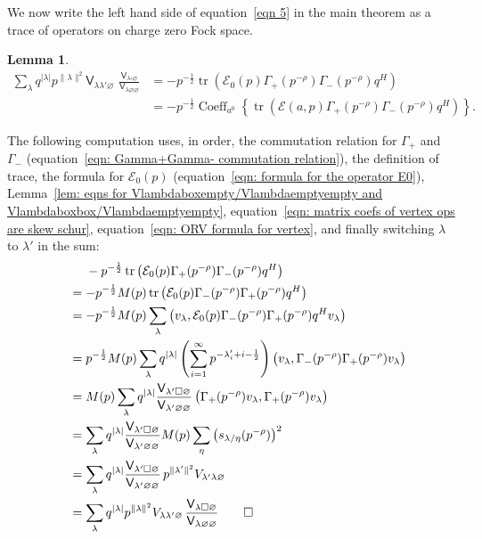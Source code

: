 \documentclass[12pt]{amsart}
\newcommand{\Vsf}{\mathsf{V}}
\newcommand{\bx}{\square}
\renewcommand{\emptyset}{\varnothing}
\newcommand{\half}{\frac{1}{2}}
\newtheorem{lemma}[theorem]{Lemma}
\theoremstyle{definition}
\newcommand{\tr}{\operatorname{tr}}
\newcommand{\E}{\mathcal{E}}
\newcommand{\ptotheminusrho}{p^{-\rho}}
\begin{document}
We now write the left hand side of equation~\eqref{eqn 5} in the main
theorem as a trace of operators on charge zero Fock space.
\begin{lemma}\label{lem: eqn 5 written as a trace}
\begin{align*}
\sum_{\lambda} q^{|\lambda |} p^{\| \lambda \| ^{2}} \Vsf_{\lambda
\lambda' \emptyset}\,\, \frac{\Vsf_{\lambda \bx
\emptyset}}{\Vsf_{\lambda \emptyset \emptyset}}& = -p^{-\half} \tr
\left(\E
_0(p)\Gamma_{+}(\ptotheminusrho )\Gamma_{-}(\ptotheminusrho )q^{H} \right)\\
& =- p^{-\half} \operatorname{Coeff}_{a^{0}}\left\{\tr
\left(\E(a,p)\Gamma_{+}(\ptotheminusrho )\Gamma_{-}(\ptotheminusrho
)q^{H} \right) \right\}.
\end{align*}
\end{lemma}
\proof The following computation uses, in order, the commutation
relation for $\Gamma_{+}$ and $\Gamma_{-}$ (equation~\eqref{eqn:
Gamma+Gamma- commutation relation}), the definition of trace, the
formula for $\E_{0} (p)$ (equation~\eqref{eqn: formula for the
operator E0}), Lemma~\ref{lem: eqns for
Vlambdaboxempty/Vlambdaemptyempty and
Vlambdaboxbox/Vlambdaemptyempty}, equation~\eqref{eqn: matrix coefs of
vertex ops are skew schur}, equation~\eqref{eqn: ORV formula for
vertex}, and finally switching $\lambda$ to $\lambda '$ in the sum:
\begin{align*}
\quad &\,\, \quad - p^{-\half} \tr \left(\E_{0}(p)\Gamma_{+}(\ptotheminusrho )\Gamma_{-}(\ptotheminusrho )q^{H} \right)\\
& =- p^{-\half} M(p) \tr \left(\E_{0}(p)\Gamma_{-}(\ptotheminusrho )\Gamma_{+}(\ptotheminusrho )q^{H} \right)\\
&=-p^{-\half}M(p)\sum_{\lambda} \left(v_{\lambda}, \E_{0}(p)\Gamma_{-}(\ptotheminusrho )\Gamma_{+}(\ptotheminusrho )q^{H} v_{\lambda}\right)\\
&=p^{-\half }M(p) \sum_{\lambda} q^{|\lambda |}
\left(\sum_{i=1}^{\infty}
p^{-\lambda'_{i}+i-\half} \right) \left(v_{\lambda}, \Gamma_{-}(\ptotheminusrho )\Gamma_{+}(\ptotheminusrho )v_{\lambda} \right)\\
&=M(p)\sum_{\lambda}q^{|\lambda |} \frac{\Vsf_{\lambda' \bx
\emptyset}}{\Vsf_{\lambda' \emptyset \emptyset}} \left(\Gamma_{+}(\ptotheminusrho )v_{\lambda },\Gamma_{+}(\ptotheminusrho )v_{\lambda } \right)\\
&= \sum_{\lambda} q^{|\lambda |} \frac{\Vsf_{\lambda' \bx
\emptyset}}{\Vsf_{\lambda' \emptyset \emptyset}} M(p)\sum_{\eta} \left(s_{\lambda /\eta}(\ptotheminusrho ) \right)^{2}\\
&= \sum_{\lambda} q^{|\lambda |} \frac{\Vsf_{\lambda' \bx
\emptyset}}{\Vsf_{\lambda' \emptyset \emptyset}}\,  p^{\| \lambda' \| ^{2}}
V_{\lambda '\lambda \emptyset}\\
&= \sum_{\lambda} q^{|\lambda |}  p^{\| \lambda \| ^{2}}
V_{\lambda \lambda' \emptyset}\,  \frac{\Vsf_{\lambda \bx
\emptyset}}{\Vsf_{\lambda \emptyset \emptyset}} \qedhere
\end{align*}
\end{document}
